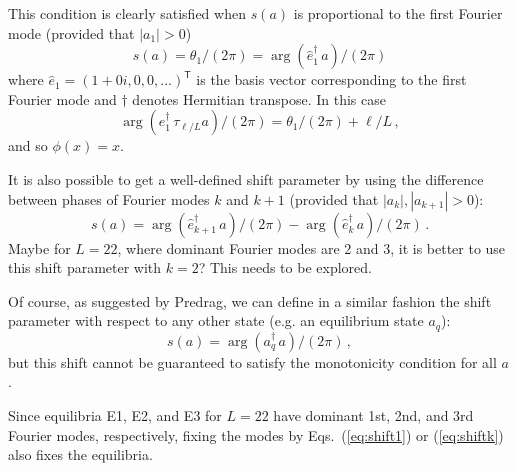 \documentclass[letter,10pt]{article}
\begin{document}
This condition is clearly satisfied when $s(a)$ is proportional to 
the first Fourier mode (provided that $|a_1| > 0$)
\begin{equation} 
  s(a) =  \theta_1/(2\pi) = \arg(\hat{e}_1^\dagger\,a)/(2\pi) 
\label{eq:shift1} \end{equation}
where $\hat{e}_1 = (1+0i, 0, 0, \ldots)^\mathsf{T}$ is the basis vector corresponding 
to the first Fourier mode and $\dagger$ denotes Hermitian transpose.
In this case
\[ \arg (e_1^\dagger\,\tau_{\ell/L}a)/(2\pi) = \theta_1/(2\pi) + \ell/L\,, \]
and so $\phi(x) = x$.

It is also possible to get a well-defined shift parameter by 
using the difference between phases of Fourier modes $k$ and $k+1$ (provided
that $|a_k|, |a_{k+1}| > 0$):
\begin{equation}
  s(a) = \arg(\hat{e}_{k+1}^\dagger\,a)/(2\pi) - 
  \arg(\hat{e}_{k}^\dagger\,a)/(2\pi)\,. 
  \label{eq:shiftk} \end{equation}
Maybe for $L = 22$, where dominant Fourier modes are 2 and 3, it is better to use 
this shift parameter with $k = 2$?  This needs to be explored.

Of course, as suggested by Predrag, we can define in a similar 
fashion the shift parameter with respect to any other 
state (e.g. an equilibrium state $a_q$):
\[ s(a) = \arg(a_q^\dagger\, a)/(2\pi)\,, \]
but this shift cannot be guaranteed to satisfy the 
monotonicity condition for all $a$.

Since equilibria E1, E2, and E3 for $L = 22$ have dominant 
1st, 2nd, and 3rd Fourier modes, respectively, fixing the modes by 
Eqs.~(\ref{eq:shift1}) or (\ref{eq:shiftk}) also fixes the equilibria.






\end{document}
